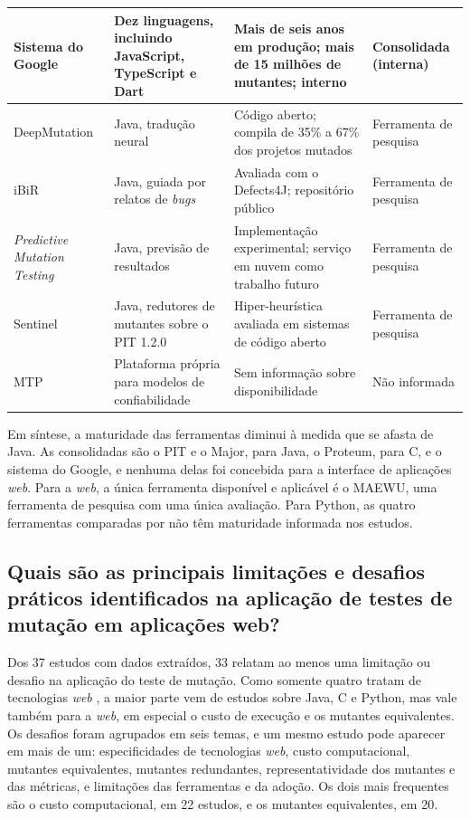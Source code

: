 \begin{longtable}{|p{2.7cm}|p{4.3cm}|p{4.3cm}|p{2.7cm}|}
    \hline
    Sistema do Google & Dez linguagens, incluindo JavaScript, TypeScript e Dart \cite{petrovic2021} & Mais de seis anos em produção; mais de 15 milhões de mutantes; interno & Consolidada (interna) \\
    \hline
    DeepMutation & Java, tradução neural \cite{tufano2020} & Código aberto; compila de 35\% a 67\% dos projetos mutados & Ferramenta de pesquisa \\
    \hline
    iBiR & Java, guiada por relatos de \textit{bugs} \cite{khanfir2023} & Avaliada com o Defects4J; repositório público & Ferramenta de pesquisa \\
    \hline
    \textit{Predictive Mutation Testing} & Java, previsão de resultados \cite{zhang2019} & Implementação experimental; serviço em nuvem como trabalho futuro & Ferramenta de pesquisa \\
    \hline
    Sentinel & Java, redutores de mutantes sobre o PIT 1.2.0 \cite{guizzo2022} & Hiper-heurística avaliada em sistemas de código aberto & Ferramenta de pesquisa \\
    \hline
    MTP & Plataforma própria para modelos de confiabilidade \cite{dimov2010} & Sem informação sobre disponibilidade & Não informada \\
\end{longtable}
\endgroup

Em síntese, a maturidade das ferramentas diminui à medida que se afasta de Java. As consolidadas são o PIT e o Major, para Java, o Proteum, para C, e o sistema do Google, e nenhuma delas foi concebida para a interface de aplicações \textit{web}. Para a \textit{web}, a única ferramenta disponível e aplicável é o MAEWU, uma ferramenta de pesquisa com uma única avaliação. Para Python, as quatro ferramentas comparadas por  não têm maturidade informada nos estudos.

\subsection[Principais limitações e desafios práticos]{Quais são as principais limitações e desafios práticos identificados na aplicação de testes de mutação em aplicações web?}
\label{subsec:limitacoes-desafios}

Dos 37 estudos com dados extraídos, 33 relatam ao menos uma limitação ou desafio na aplicação do teste de mutação. Como somente quatro tratam de tecnologias \textit{web} \cite{yandrapally2021, esterobotaro2010, nica2011, belli2011}, a maior parte vem de estudos sobre Java, C e Python, mas vale também para a \textit{web}, em especial o custo de execução e os mutantes equivalentes. Os desafios foram agrupados em seis temas, e um mesmo estudo pode aparecer em mais de um: especificidades de tecnologias \textit{web}, custo computacional, mutantes equivalentes, mutantes redundantes, representatividade dos mutantes e das métricas, e limitações das ferramentas e da adoção. Os dois mais frequentes são o custo computacional, em 22 estudos, e os mutantes equivalentes, em 20.

